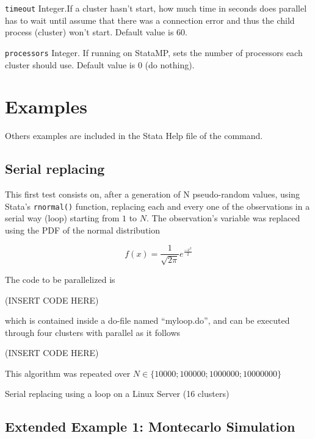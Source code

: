 \documentclass[bib]{statapress}
\begin{document}
\hangpara
{\tt timeout} Integer.If a cluster hasn't start, how much time in seconds does parallel has to wait until assume that there was a connection error and thus the child process (cluster) won't start. Default value is 60.

\hangpara
{\tt processors} Integer. If running on StataMP, sets the number of processors each cluster should use. Default value is 0 (do nothing).



\section{Examples}

Others examples are included in the Stata Help file of the command.

\subsection{Serial replacing}

This first test consists on, after a generation of N pseudo-random values, using Stata's {\tt rnormal()} function, replacing each and every one of the observations in a serial way (loop) starting from $1$ to $N$. The observation's variable was replaced using the PDF of the normal distribution

\begin{equation*}
f(x) = \frac{1}{\sqrt{2 \pi}}e^{\frac{-x^2}{2}}
\end{equation*}

The code to be parallelized is

(INSERT CODE HERE)

\noindent which is contained inside a do-file named ``myloop.do'', and can be executed through four clusters with parallel as it follows

(INSERT CODE HERE)

This algorithm was repeated over $N \in \{10000;100000;1000000;10000000\}$

\begin{table}[!h]
\centering
\caption{Serial replacing using a loop on a Linux Server (16 clusters)}

\end{table}

\subsection{Extended Example 1: Montecarlo Simulation}
\end{document}

